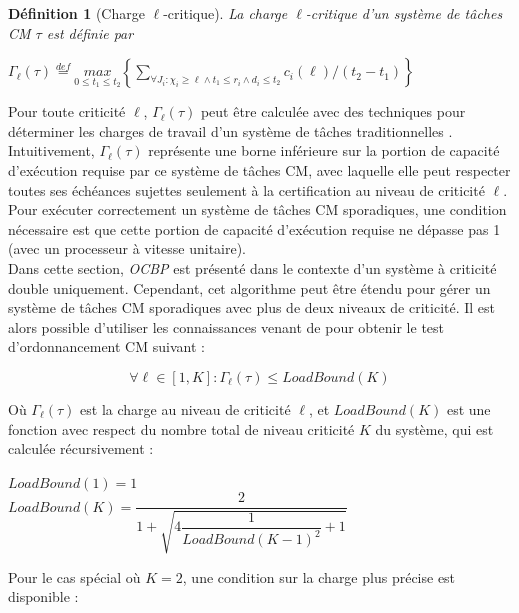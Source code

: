 \documentclass[12pt,a4paper,oneside]{book}
\theoremstyle{break}
\newtheorem{defin}{Définition}[chapter]
\theoremstyle{breakplain}
\begin{document}
\begin{defin}[Charge $\ell$-critique]
La charge $\ell$-critique d'un système de tâches CM $\tau$ est définie par 

\begin{center}
$\Gamma_\ell(\tau) \overset{def}{=} \underset{0\leq t_1 \leq t_2}{max} \left\lbrace \underset{\forall J_i:\chi_i \geq \ell \wedge t_1 \leq r_i\wedge d_i\leq t_2}{\sum} c_i(\ell)/(t_2-t_1) \right\rbrace$
\end{center}
\end{defin}

Pour toute criticité $\ell$, $\Gamma_\ell(\tau)$ peut être calculée avec des techniques pour déterminer les charges de travail d'un système de tâches traditionnelles \cite{Baker05algorithmsfor}.\\Intuitivement, $\Gamma_\ell(\tau)$ représente une borne inférieure sur la portion de capacité d'exécution requise par ce système de tâches CM, avec laquelle elle peut respecter toutes ses échéances sujettes seulement à la certification au niveau de criticité $\ell$. Pour exécuter correctement un système de tâches CM sporadiques, une condition nécessaire est que cette portion de capacité d'exécution requise ne dépasse pas 1 (avec un processeur à vitesse unitaire).\\

Dans cette section, \textit{OCBP} est présenté dans le contexte d'un système à criticité double uniquement. Cependant, cet algorithme peut être étendu pour gérer un système de tâches CM sporadiques avec plus de deux niveaux de criticité. Il est alors possible d'utiliser les connaissances venant de \cite{baruah2010mixed} pour obtenir le test d'ordonnancement CM suivant :

\begin{equation}
\label{test:ocbp}
\forall \ell \in [1,K] : \Gamma_\ell(\tau) \le LoadBound(K)
\end{equation}

Où $\Gamma_\ell(\tau)$ est la charge au niveau de criticité $\ell$, et $LoadBound(K)$ est une fonction avec respect du nombre total de niveau criticité $K$ du système, qui est calculée récursivement :

\begin{center}
$LoadBound(1) = 1$\\
$LoadBound(K) = \dfrac{2}{1+\sqrt{4\dfrac{1}{LoadBound(K-1)^2}+1}}$
\end{center}

Pour le cas spécial où $K = 2$, une condition sur la charge plus précise est disponible \cite{li2010load} :
\end{document}

